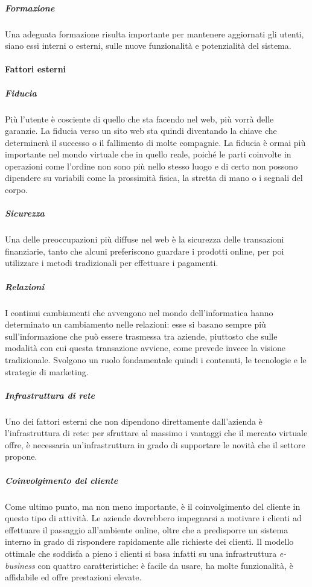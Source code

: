 \subparagraph{Formazione}
Una adeguata formazione risulta importante per mantenere aggiornati gli utenti, siano essi interni o esterni, sulle nuove funzionalità e potenzialità del sistema.

\paragraph{Fattori esterni}
\subparagraph{Fiducia}
Più l'utente è cosciente di quello che sta facendo nel web, più vorrà delle garanzie. La fiducia verso un sito web sta quindi diventando la chiave che determinerà il successo o il fallimento di molte compagnie. La fiducia è ormai più importante nel mondo virtuale che in quello reale, poiché le parti coinvolte in operazioni come l'ordine non sono più nello stesso luogo e di certo non possono dipendere su variabili come la prossimità fisica, la stretta di mano o i segnali del corpo.

\subparagraph{Sicurezza}
Una delle preoccupazioni più diffuse nel web è la sicurezza delle transazioni finanziarie, tanto che alcuni preferiscono guardare i prodotti online, per poi utilizzare i metodi tradizionali per effettuare i pagamenti.

\subparagraph{Relazioni}
I continui cambiamenti che avvengono nel mondo dell'informatica hanno determinato un cambiamento nelle relazioni: esse si basano sempre più sull'informazione che può essere trasmessa tra aziende, piuttosto che sulle modalità con cui questa transazione avviene, come prevede invece la visione tradizionale. Svolgono un ruolo fondamentale quindi i contenuti, le tecnologie e le strategie di marketing.

\subparagraph{Infrastruttura di rete}
Uno dei fattori esterni che non dipendono direttamente dall'azienda è l'infrastruttura di rete: per sfruttare al massimo i vantaggi che il mercato virtuale offre, è necessaria un'infrastruttura in grado di supportare le novità che il settore propone. 

\subparagraph{Coinvolgimento del cliente}
Come ultimo punto, ma non meno importante, è il coinvolgimento del cliente in questo tipo di attività. Le aziende dovrebbero impegnarsi a motivare i clienti ad effettuare il passaggio all'ambiente online, oltre che a predisporre un sistema interno in grado di rispondere rapidamente alle richieste dei clienti.
Il modello ottimale che soddisfa a pieno i clienti si basa infatti su una infrastruttura \textit{e-business} con quattro caratteristiche: è facile da usare, ha molte funzionalità, è affidabile ed offre prestazioni elevate.

